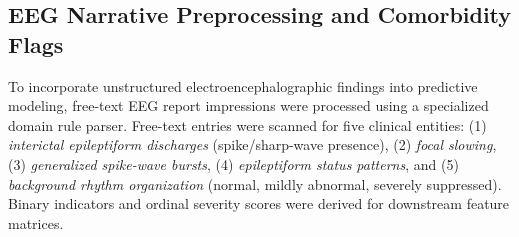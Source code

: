 \documentclass[11pt,a4paper]{article}
\begin{document}
\begin{table}[h!]
\centering
\caption{\textbf{MIMIC-IV v3.1 Epilepsy Cohort Characteristics ($n = 4,187$ admissions, 3,641 unique patients).} Values are count (\%) or mean $\pm$ SD. IQR = interquartile range.}
\label{tab:cohort}
\end{table}

\subsection{EEG Narrative Preprocessing and Comorbidity Flags}
To incorporate unstructured electroencephalographic findings into predictive modeling, free-text EEG report impressions were processed using a specialized domain rule parser. Free-text entries were scanned for five clinical entities: (1) \textit{interictal epileptiform discharges} (spike/sharp-wave presence), (2) \textit{focal slowing}, (3) \textit{generalized spike-wave bursts}, (4) \textit{epileptiform status patterns}, and (5) \textit{background rhythm organization} (normal, mildly abnormal, severely suppressed). Binary indicators and ordinal severity scores were derived for downstream feature matrices. 
\end{document}
